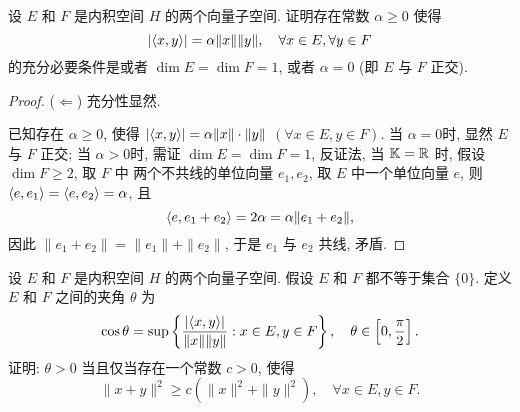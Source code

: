 \begin{exercise}
设 $E$ 和 $F$ 是内积空间 $H$ 的两个向量子空间. 证明存在常数 $\alpha\geq 0$ 使得
\[|\langle x,y\rangle|=\alpha\|x\|\|y\|,\quad\forall x\in E,\forall y\in F\]
的充分必要条件是或者 $\dim E=\dim F=1$, 或者 $\alpha=0$ (即 $E$ 与 $F$ 正交).
\end{exercise}

\begin{proof}
($\Leftarrow$)
充分性显然.

\necessary
已知存在 $\alpha\geq 0$, 使得 
$|\langle x,y\rangle|=\alpha \|x\|\cdot\|y\|$ $(\forall x\in E,y\in F)$.
当 $\alpha=0$时, 显然 $E$ 与 $F$ 正交;
当 $\alpha>0$时, 需证  $\dim E=\dim F=1$, 
反证法, 当 $\mathbb{K}=\mathbb{R}$ 时, 假设 $\dim F\geq 2$, 取 $F$ 中
两个不共线的单位向量 $e_1,e_2$, 取 $E$ 中一个单位向量 $e$,
则 $\langle e,e_1\rangle=\langle e,e_2\rangle=\alpha$, 且
\[\langle e,e_1+e_2\rangle=2\alpha=\alpha\|e_1+e_2\|,\]
因此 $\|e_1+e_2\|=\|e_1\|+\|e_2\|$, 于是 $e_1$ 与 $e_2$ 共线, 矛盾.
\end{proof}




\begin{exercise}
    设 $E$ 和 $F$ 是内积空间 $H$ 的两个向量子空间.
    假设 $E$ 和 $F$ 都不等于集合 $\{0\}$.
    定义 $E$ 和 $F$ 之间的夹角 $\theta$ 为
    \[\cos\theta=\sup\left\{\frac{|\langle x,y\rangle|}{\|x\|\|y\|}:x\in E, y\in F\right\},\quad\theta\in\left[0,\frac{\pi}{2}\right].\]
    证明: $\theta>0$ 当且仅当存在一个常数 $c>0$, 使得
    \[\|x+y\|^2\geq c(\|x\|^2+\|y\|^2),\quad\forall x\in E, y\in F.\]
\end{exercise}

